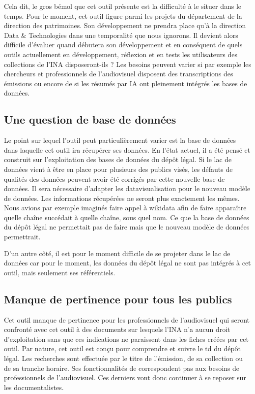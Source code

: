 
Cela dit, le gros bémol que cet outil présente est la difficulté à le situer dans le temps. Pour le moment, cet outil figure parmi les projets du département de la direction des patrimoines. Son développement ne prendra place qu'à la direction Data \& Technologies dans une temporalité que nous ignorons. Il devient alors difficile d'évaluer quand débutera son développement et en conséquent de quels outils actuellement en développement, réflexion et en tests les utilisateurs des collections de l'INA disposeront-ils ? Les besoins peuvent varier si par exemple les chercheurs et professionnels de l'audiovisuel disposent des transcriptions des émissions ou encore de si les résumés par IA ont pleinement intégrés les bases de données. 

\subsection{Une question de base de données}

Le point sur lequel l'outil peut particulièrement varier est la base de données dans laquelle cet outil ira récupérer ses données. En l'état actuel, il a été pensé et construit sur l'exploitation des bases de données du dépôt légal. Si le lac de données vient à être en place pour plusieurs des publics visés, les défauts de qualités des données peuvent avoir été corrigés par cette nouvelle base de données. Il sera nécessaire d'adapter les datavisualisation pour le nouveau modèle de données. Les informations récupérées ne seront plus exactement les mêmes. Nous avions par exemple imaginés faire appel à wikidata afin de faire apparaître quelle chaîne succédait à quelle chaîne, sous quel nom. Ce que la base de données du dépôt légal ne permettait pas de faire mais que le nouveau modèle de données permettrait. 

D'un autre côté, il est pour le moment difficile de se projeter dans le lac de données car pour le moment, les données du dépôt légal ne sont pas intégrés à cet outil, mais seulement ses référentiels. 

\subsection{Manque de pertinence pour tous les publics}

Cet outil manque de pertinence pour les professionnels de l’audiovisuel qui seront confronté avec cet outil à des documents sur lesquels l'INA n'a aucun droit d'exploitation sans que ces indications ne paraissent dans les fiches créées par cet outil. Par nature, cet outil est conçu pour comprendre et suivre le \gls{td} du dépôt légal. Les recherches sont effectuée par le titre de l'émission, de sa collection ou de sa tranche horaire. Ses fonctionnalités de correspondent pas aux besoins de professionnels de l'audiovisuel. Ces derniers vont donc continuer à se reposer sur les documentalistes. 

